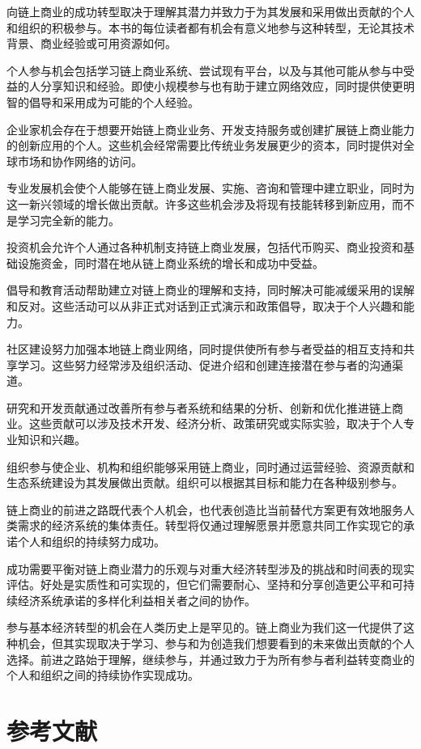 \documentclass[
  Letterpaper,
]{scrbook}
\begin{document}
向链上商业的成功转型取决于理解其潜力并致力于为其发展和采用做出贡献的个人和组织的积极参与。本书的每位读者都有机会有意义地参与这种转型，无论其技术背景、商业经验或可用资源如何。

个人参与机会包括学习链上商业系统、尝试现有平台，以及与其他可能从参与中受益的人分享知识和经验。即使小规模参与也有助于建立网络效应，同时提供使更明智的倡导和采用成为可能的个人经验。

企业家机会存在于想要开始链上商业业务、开发支持服务或创建扩展链上商业能力的创新应用的个人。这些机会经常需要比传统业务发展更少的资本，同时提供对全球市场和协作网络的访问。

专业发展机会使个人能够在链上商业发展、实施、咨询和管理中建立职业，同时为这一新兴领域的增长做出贡献。许多这些机会涉及将现有技能转移到新应用，而不是学习完全新的能力。

投资机会允许个人通过各种机制支持链上商业发展，包括代币购买、商业投资和基础设施资金，同时潜在地从链上商业系统的增长和成功中受益。

倡导和教育活动帮助建立对链上商业的理解和支持，同时解决可能减缓采用的误解和反对。这些活动可以从非正式对话到正式演示和政策倡导，取决于个人兴趣和能力。

社区建设努力加强本地链上商业网络，同时提供使所有参与者受益的相互支持和共享学习。这些努力经常涉及组织活动、促进介绍和创建连接潜在参与者的沟通渠道。

研究和开发贡献通过改善所有参与者系统和结果的分析、创新和优化推进链上商业。这些贡献可以涉及技术开发、经济分析、政策研究或实际实验，取决于个人专业知识和兴趣。

组织参与使企业、机构和组织能够采用链上商业，同时通过运营经验、资源贡献和生态系统建设为其发展做出贡献。组织可以根据其目标和能力在各种级别参与。

链上商业的前进之路既代表个人机会，也代表创造比当前替代方案更有效地服务人类需求的经济系统的集体责任。转型将仅通过理解愿景并愿意共同工作实现它的承诺个人和组织的持续努力成功。

成功需要平衡对链上商业潜力的乐观与对重大经济转型涉及的挑战和时间表的现实评估。好处是实质性和可实现的，但它们需要耐心、坚持和分享创造更公平和可持续经济系统承诺的多样化利益相关者之间的协作。

参与基本经济转型的机会在人类历史上是罕见的。链上商业为我们这一代提供了这种机会，但其实现取决于学习、参与和为创造我们想要看到的未来做出贡献的个人选择。前进之路始于理解，继续参与，并通过致力于为所有参与者利益转变商业的个人和组织之间的持续协作实现成功。


\chapter*{参考文献}\label{ux53c2ux8003ux6587ux732e}
\end{document}
